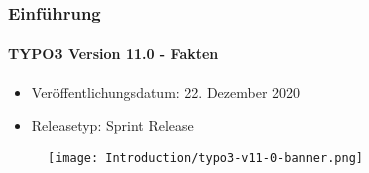 %

\begin{frame}[fragile]
	\frametitle{Einführung}
	\framesubtitle{TYPO3 Version 11.0 - Fakten}

	\begin{itemize}
		\item Veröffentlichungsdatum: 22. Dezember 2020
		\item Releasetyp: Sprint Release
	\end{itemize}

	\begin{figure}
		\texttt{[image: Introduction/typo3-v11-0-banner.png]}
	\end{figure}

\end{frame}

